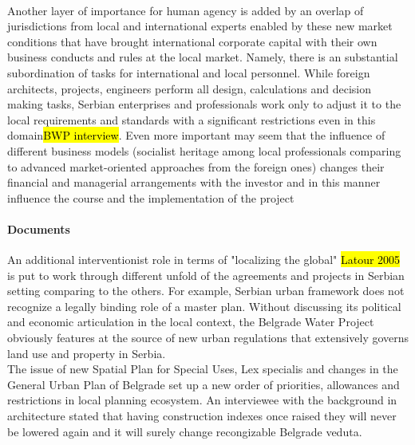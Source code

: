 \documentclass[11pt]{report}
\begin{document}
\\
Another layer of importance for human agency is added by an overlap of jurisdictions from local and international experts enabled by these new market conditions that have brought international corporate capital with their own business conducts and rules at the local market. Namely, there is an substantial subordination of tasks for international and local personnel. While foreign architects, projects, engineers perform all design, calculations and decision making tasks, Serbian enterprises and professionals work only to adjust it to the local requirements and standards with a significant restrictions even in this domain\footnotemark  \hl{BWP interview}. Even more important may seem that the influence of different business models (socialist heritage among local professionals comparing to advanced market-oriented approaches from the foreign ones) changes their financial and managerial arrangements with the investor and in this manner influence the course and the implementation of the project

\paragraph{Documents}

An additional interventionist role in terms of "localizing the global" \hl{Latour 2005} is put to work through different unfold of the agreements and projects in Serbian setting comparing to the others.
For example, Serbian urban framework does not recognize a legally binding role of a master plan. Without discussing its political and economic articulation in the local context, the Belgrade Water Project obviously features at the source of new urban regulations that extensively governs land use and property in Serbia.\footnotemark
{}
\\
The issue of new Spatial Plan for Special Uses, Lex specialis and changes in the General Urban Plan of Belgrade set up a new order of priorities, allowances and restrictions in local planning ecosystem. An interviewee with the background in architecture stated that having construction indexes once raised they will never be lowered again and it will surely change recongizable Belgrade veduta.
\end{document}
